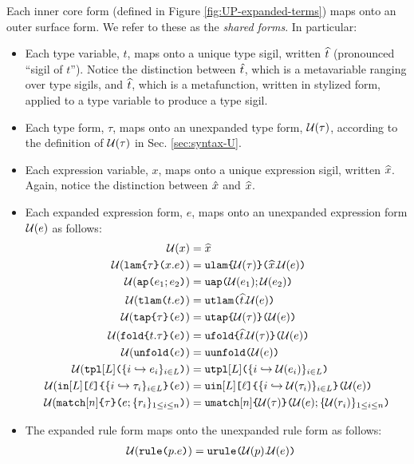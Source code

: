 {{{{Each inner core form (defined in Figure \ref{fig:UP-expanded-terms}) maps onto an outer surface form. We refer to these as the \emph{shared forms}. In particular:
\begin{itemize}
\item Each type variable, $t$, maps onto a unique {type sigil}, written $\widehat{t}$ (pronounced ``sigil of $t$''). Notice the distinction between ${\hat{t}}$, which is a metavariable ranging over type sigils, and $\widehat{t}$, which is a metafunction, written in stylized form, applied to a type variable to produce a type sigil.
\item Each type form, $\tau$, maps onto an unexpanded type form, $\mathcal{U}(\tau)$, according to the definition of $\mathcal{U}(\tau)$ in Sec. \ref{sec:syntax-U}.
\item Each expression variable, $x$, maps onto a unique expression sigil, written $\widehat{x}$. Again, notice the distinction between ${\hat x}$ and $\widehat{x}$.
\item Each expanded expression form, $e$, maps onto an unexpanded expression form $\mathcal{U}(e)$ as follows:
\begin{align*}
\mathcal{U}(x) & = \widehat{x}\\
\mathcal{U}(\texttt{lam}\texttt{\{}\tau\texttt{\}(}x.e\texttt{)}) & = \texttt{ulam}\texttt{\{}\mathcal{U}(\tau)\texttt{\}(}\widehat{x}.\mathcal{U}(e)\texttt{)}\\
\mathcal{U}(\texttt{ap}\texttt{(}e_1; e_2\texttt{)}) & = \texttt{uap}\texttt{(}\mathcal{U}(e_1); \mathcal{U}(e_2)\texttt{)}\\
\mathcal{U}(\texttt{tlam}\texttt{(}t.e\texttt{)}) & = \texttt{utlam}\texttt{(}\widehat{t}.\mathcal{U}(e)\texttt{)}\\
\mathcal{U}(\texttt{tap}\texttt{\{}\tau\texttt{\}(}e\texttt{)}) & = \texttt{utap}\texttt{\{}\mathcal{U}(\tau)\texttt{\}(}\mathcal{U}(e)\texttt{)}\\
\mathcal{U}(\texttt{fold}\texttt{\{}t.\tau\texttt{\}(}e\texttt{)}) & = \texttt{ufold}\texttt{\{}\widehat{t}.\mathcal{U}(\tau)\texttt{\}(}\mathcal{U}(e)\texttt{)}\\
\mathcal{U}(\texttt{unfold}\texttt{(}e\texttt{)}) & = \texttt{uunfold}\texttt{(}\mathcal{U}(e)\texttt{)}\\
\mathcal{U}(\texttt{tpl}[L]\texttt{(}\{i \hookrightarrow e_{i}\}_{i \in L}\texttt{)}) & = \texttt{utpl}[L]\texttt{(}\{i \hookrightarrow \mathcal{U}(e_{i})\}_{i \in L}\texttt{)}\\
\mathcal{U}(\texttt{in}[L]\texttt{[}\ell\texttt{]\{}\{i \hookrightarrow \tau_{i}\}_{i \in L}\texttt{\}(}e\texttt{)}) &= \texttt{uin}[L]\texttt{[}\ell\texttt{]\{}\{i \hookrightarrow \mathcal{U}(\tau_{i})\}_{i \in L}\texttt{\}(}\mathcal{U}(e)\texttt{)}\\
\mathcal{U}(\texttt{match}[n]\texttt{\{}\tau\texttt{\}(}e; \{r_{i}\}_{1 \leq i \leq n}\texttt{)}) &= \texttt{umatch}[n]\texttt{\{}\mathcal{U}(\tau)\texttt{\}(}\mathcal{U}(e); \{\mathcal{U}(r_i)\}_{1 \leq i \leq n}\texttt{)}\\
\end{align*}
\item The expanded rule form maps onto the unexpanded rule form as follows:
\begin{align*}
\Uof{\aematchrule{p}{e}} & = \aumatchrule{\Uof{p}}{\Uof{e}}

\end{align*}
\end{itemize}}}}}
